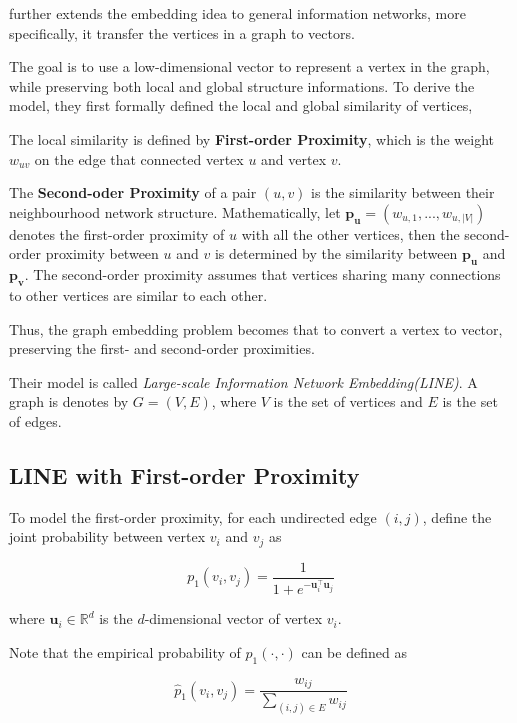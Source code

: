 \documentclass[]{article}
\begin{document}
\cite{tang2015line} further extends the embedding idea to general
information networks, more specifically, it transfer the vertices in a
graph to vectors.

The goal is to use a low-dimensional vector to represent a vertex in the
graph, while preserving both local and global structure informations. To
derive the model, they first formally defined the local and global
similarity of vertices,

The local similarity is defined by \textbf{First-order Proximity}, which
is the weight \(w_{uv}\) on the edge that connected vertex \(u\) and
vertex \(v\).

The \textbf{Second-oder Proximity} of a pair \((u, v)\) is the
similarity between their neighbourhood network structure.
Mathematically, let \(\mathbf{p_u} = (w_{u,1},...,w_{u,|V|})\) denotes
the first-order proximity of \(u\) with all the other vertices, then the
second-order proximity between \(u\) and \(v\) is determined by the
similarity between \(\mathbf{p_u}\) and \(\mathbf{p_v}\). The
second-order proximity assumes that vertices sharing many connections to
other vertices are similar to each other.

Thus, the graph embedding problem becomes that to convert a vertex to
vector, preserving the first- and second-order proximities.

Their model is called \emph{Large-scale Information Network
Embedding(LINE)}. A graph is denotes by \(G = (V, E)\), where \(V\) is
the set of vertices and \(E\) is the set of edges.

\subsection{LINE with First-order
Proximity}\label{line-with-first-order-proximity}

To model the first-order proximity, for each undirected edge \((i, j)\),
define the joint probability between vertex \(v_i\) and \(v_j\) as

\begin{equation}
p_1(v_i, v_j) = \frac{1}{1 + e^{- \mathbf{u}_i^{\top} \mathbf{u}_j}}
\end{equation}

where \(\mathbf{u}_i \in \mathbb{R}^d\) is the \(d\)-dimensional vector
of vertex \(v_i\).

Note that the empirical probability of \(p_1(\cdot, \cdot)\) can be
defined as

\begin{equation}
\hat{p}_1(v_i, v_j) = \frac{w_{ij}}{\sum_{(i,j) \in E} w_{ij}}
\end{equation}
\end{document}
